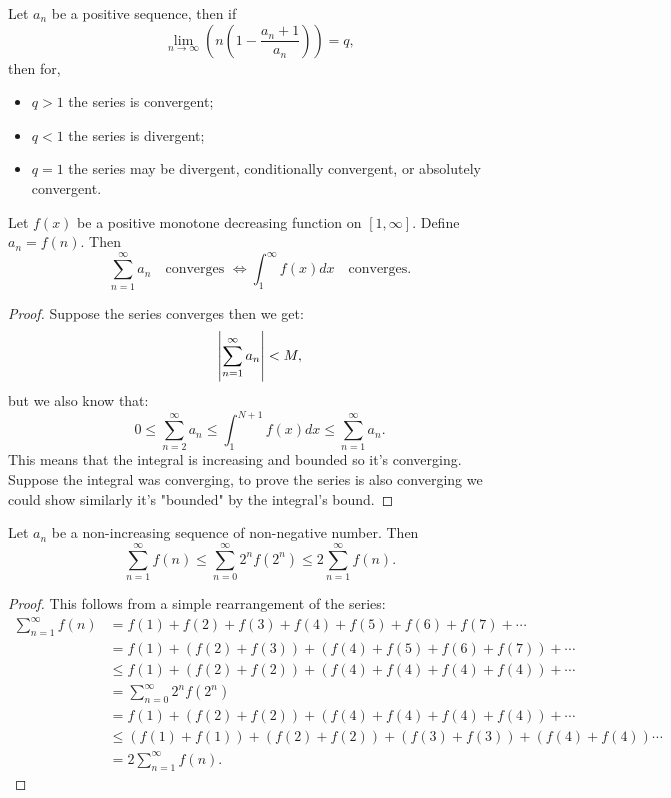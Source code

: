 \documentclass[11pt,a4paper]{article}
\begin{document}
  \begin{proposition}
    Let $a_n$ be a positive sequence, then if
    \[
      \lim_{n\to\infty} \left(n\left(1-\frac{a_n+1}{a_n}\right)\right) = q,
    \]
    then for,
    \begin{itemize}
      \item $q > 1$ the series is convergent;
      \item $q < 1$ the series is divergent;
      \item $q = 1$ the series may be divergent, conditionally convergent,
        or absolutely convergent.
    \end{itemize}
  \end{proposition}
	
	\newpage
	
  \begin{proposition}
    Let $f(x)$ be a positive monotone decreasing function on $[1,\infty]$. 
    Define $a_n = f(n)$. Then
    \[
      \sum_{n=1}^{\infty}{a_n} \quad \text{converges } \iff 
      \int_{1}^{\infty}{f(x)dx} \quad\text{converges}.
    \]
  \end{proposition}
  \begin{proof}
    Suppose the series converges then we get:
    \[
      \left\lvert\sum_{n=1}^{\infty} a_n\right\rvert < M,
    \]
    but we also know that:
    \[
      0 \le
      \sum_{n=2}^{\infty} a_n \le 
      \int_{1}^{N+1} f(x)dx \le
      \sum_{n=1}^{\infty} a_n.
    \]
    This means that the integral is increasing and bounded so it's converging. 
    Suppose the integral was converging, to prove the series is also converging 
    we could show similarly it's "bounded" by the integral's bound.
  \end{proof}
	
	\newpage
	
  \begin{proposition}
    Let $a_n$ be a non-increasing sequence of non-negative number.
    Then
    \[
       \sum_{n=1}^\infty {f(n)} \le 
       \sum_{n=0}^\infty {2^n f(2^n)} \le
      2\sum_{n=1}^\infty {f(n)}.
    \]
  \end{proposition}
  \begin{proof}
    This follows from a simple rearrangement of the series:
    \begin{align*}
      \sum_{n=1}^\infty{f(n)} 
      & = f(1) +  f(2) + f(3)  +  f(4) + f(5) + f(6) + f(7)  +\cdots \\
      & = f(1) + (f(2) + f(3)) + (f(4) + f(5) + f(6) + f(7)) +\cdots \\
       &\le f(1) + (f(2) + f(2)) + (f(4) + f(4) + f(4) + f(4)) +\cdots  \\
      & =  \sum_{n=0}^\infty{2^nf(2^n)} \\
      & = f(1) + (f(2) + f(2)) + (f(4) + f(4) + f(4) + f(4)) +\cdots \\
      & \le  (f(1)+f(1))+(f(2)+f(2))+(f(3)+f(3))+(f(4)+f(4)) \cdots \\
      & = 2\sum_{n=1}^\infty {f(n)}.
    \end{align*}
  \end{proof}
	
\end{document}
